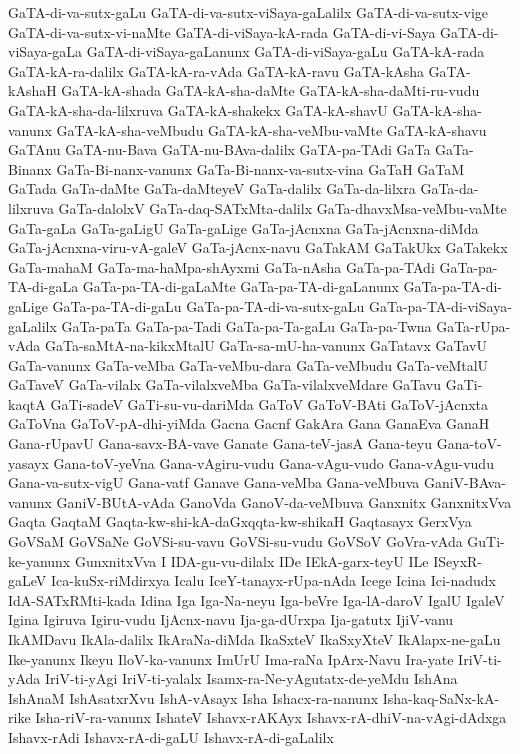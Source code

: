 {GaTA-di-va-sutx-gaLu
GaTA-di-va-sutx-viSaya-gaLalilx
GaTA-di-va-sutx-vige
GaTA-di-va-sutx-vi-naMte
GaTA-di-viSaya-kA-rada
GaTA-di-vi-Saya
GaTA-di-viSaya-gaLa
GaTA-di-viSaya-gaLanunx
GaTA-di-viSaya-gaLu
GaTA-kA-rada
GaTA-kA-ra-dalilx
GaTA-kA-ra-vAda
GaTA-kA-ravu
GaTA-kAsha
GaTA-kAshaH
GaTA-kA-shada
GaTA-kA-sha-daMte
GaTA-kA-sha-daMti-ru-vudu
GaTA-kA-sha-da-lilxruva
GaTA-kA-shakekx
GaTA-kA-shavU
GaTA-kA-sha-vanunx
GaTA-kA-sha-veMbudu
GaTA-kA-sha-veMbu-vaMte
GaTA-kA-shavu
GaTAnu
GaTA-nu-Bava
GaTA-nu-BAva-dalilx
GaTA-pa-TAdi
GaTa
GaTa-Binanx
GaTa-Bi-nanx-vanunx
GaTa-Bi-nanx-va-sutx-vina
GaTaH
GaTaM
GaTada
GaTa-daMte
GaTa-daMteyeV
GaTa-dalilx
GaTa-da-lilxra
GaTa-da-lilxruva
GaTa-dalolxV
GaTa-daq-SATxMta-dalilx
GaTa-dhavxMsa-veMbu-vaMte
GaTa-gaLa
GaTa-gaLigU
GaTa-gaLige
GaTa-jAcnxna
GaTa-jAcnxna-diMda
GaTa-jAcnxna-viru-vA-galeV
GaTa-jAcnx-navu
GaTakAM
GaTakUkx
GaTakekx
GaTa-mahaM
GaTa-ma-haMpa-shAyxmi
GaTa-nAsha
GaTa-pa-TAdi
GaTa-pa-TA-di-gaLa
GaTa-pa-TA-di-gaLaMte
GaTa-pa-TA-di-gaLanunx
GaTa-pa-TA-di-gaLige
GaTa-pa-TA-di-gaLu
GaTa-pa-TA-di-va-sutx-gaLu
GaTa-pa-TA-di-viSaya-gaLalilx
GaTa-paTa
GaTa-pa-Tadi
GaTa-pa-Ta-gaLu
GaTa-pa-Twna
GaTa-rUpa-vAda
GaTa-saMtA-na-kikxMtalU
GaTa-sa-mU-ha-vanunx
GaTatavx
GaTavU
GaTa-vanunx
GaTa-veMba
GaTa-veMbu-dara
GaTa-veMbudu
GaTa-veMtalU
GaTaveV
GaTa-vilalx
GaTa-vilalxveMba
GaTa-vilalxveMdare
GaTavu
GaTi-kaqtA
GaTi-sadeV
GaTi-su-vu-dariMda
GaToV
GaToV-BAti
GaToV-jAcnxta
GaToVna
GaToV-pA-dhi-yiMda
Gacna
Gacnf
GakAra
Gana
GanaEva
GanaH
Gana-rUpavU
Gana-savx-BA-vave
Ganate
Gana-teV-jasA
Gana-teyu
Gana-toV-yasayx
Gana-toV-yeVna
Gana-vAgiru-vudu
Gana-vAgu-vudo
Gana-vAgu-vudu
Gana-va-sutx-vigU
Gana-vatf
Ganave
Gana-veMba
Gana-veMbuva
GaniV-BAva-vanunx
GaniV-BUtA-vAda
GanoVda
GanoV-da-veMbuva
Ganxnitx
GanxnitxVva
Gaqta
GaqtaM
Gaqta-kw-shi-kA-daGxqqta-kw-shikaH
Gaqtasayx
GerxVya
GoVSaM
GoVSaNe
GoVSi-su-vavu
GoVSi-su-vudu
GoVSoV
GoVra-vAda
GuTi-ke-yanunx
GunxnitxVva
I
IDA-gu-vu-dilalx
IDe
IEkA-garx-teyU
ILe
ISeyxR-gaLeV
Ica-kuSx-riMdirxya
Icalu
IceY-tanayx-rUpa-nAda
Icege
Icina
Ici-nadudx
IdA-SATxRMti-kada
Idina
Iga
Iga-Na-neyu
Iga-beVre
Iga-lA-daroV
IgalU
IgaleV
Igina
Igiruva
Igiru-vudu
IjAcnx-navu
Ija-ga-dUrxpa
Ija-gatutx
IjiV-vanu
IkAMDavu
IkAla-dalilx
IkAraNa-diMda
IkaSxteV
IkaSxyXteV
IkAlapx-ne-gaLu
Ike-yanunx
Ikeyu
IloV-ka-vanunx
ImUrU
Ima-raNa
IpArx-Navu
Ira-yate
IriV-ti-yAda
IriV-ti-yAgi
IriV-ti-yalalx
Isamx-ra-Ne-yAgutatx-de-yeMdu
IshAna
IshAnaM
IshAsatxrXvu
IshA-vAsayx
Isha
Ishacx-ra-nanunx
Isha-kaq-SaNx-kA-rike
Isha-riV-ra-vanunx
IshateV
Ishavx-rAKAyx
Ishavx-rA-dhiV-na-vAgi-dAdxga
Ishavx-rAdi
Ishavx-rA-di-gaLU
Ishavx-rA-di-gaLalilx
}
